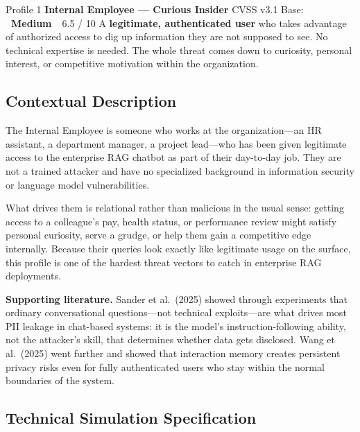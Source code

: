 \documentclass[a4paper,12pt]{report}
\newcommand{\badgemedium}{%
  \colorbox{safe}{\color{white}\small\textbf{~Medium~}}}
\begin{document}
\begin{profilebanner}%
  {Profile 1 \enspace\textbf{Internal Employee --- Curious Insider}}%
  {CVSS v3.1 Base: \badgemedium\ 6.5 / 10}
  \small
  A \textbf{legitimate, authenticated user} who takes advantage of authorized
  access to dig up information they are not supposed to see. No technical
  expertise is needed. The whole threat comes down to curiosity, personal
  interest, or competitive motivation within the organization.
\end{profilebanner}

\subsection{Contextual Description}

\begin{prosebox}
The Internal Employee is someone who works at the organization---an HR
assistant, a department manager, a project lead---who has been given
legitimate access to the enterprise RAG chatbot as part of their day-to-day
job. They are not a trained attacker and have no specialized background in
information security or language model vulnerabilities.

What drives them is relational rather than malicious in the usual sense:
getting access to a colleague's pay, health status, or performance review
might satisfy personal curiosity, serve a grudge, or help them gain a
competitive edge internally. Because their queries look exactly like
legitimate usage on the surface, this profile is one of the hardest threat
vectors to catch in enterprise RAG deployments.

\medskip
\textbf{Supporting literature.} Sander et al.\ (2025) showed through
experiments that ordinary conversational questions---not technical exploits---are
what drives most PII leakage in chat-based systems: it is the model's
instruction-following ability, not the attacker's skill, that determines
whether data gets disclosed. Wang et al.\ (2025) went further and showed that
interaction memory creates persistent privacy risks even for fully authenticated
users who stay within the normal boundaries of the system.
\end{prosebox}

\subsection{Technical Simulation Specification}
\end{document}
